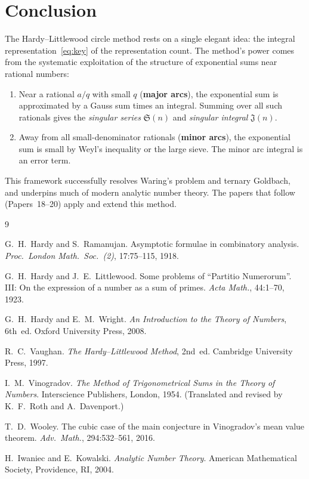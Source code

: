 \documentclass[12pt,a4paper]{amsart}
\theoremstyle{definition}
\begin{document}
\section{Conclusion}

The Hardy--Littlewood circle method rests on a single elegant idea: the
integral representation~\eqref{eq:key} of the representation count.
The method's power comes from the systematic exploitation of the
structure of exponential sums near rational numbers:
\begin{enumerate}
  \item Near a rational $a/q$ with small $q$ (\textbf{major arcs}),
    the exponential sum is approximated by a Gauss sum times an integral.
    Summing over all such rationals gives the \emph{singular series}
    $\mathfrak{S}(n)$ and \emph{singular integral} $\mathfrak{J}(n)$.
  \item Away from all small-denominator rationals (\textbf{minor arcs}),
    the exponential sum is small by Weyl's inequality or the large sieve.
    The minor arc integral is an error term.
\end{enumerate}

This framework successfully resolves Waring's problem and ternary Goldbach,
and underpins much of modern analytic number theory.  The papers that follow
(Papers~18--20) apply and extend this method.

\begin{thebibliography}{9}

G.~H.~Hardy and S.~Ramanujan.
\newblock Asymptotic formulae in combinatory analysis.
\newblock \emph{Proc.\ London Math.\ Soc.\ (2)}, 17:75--115, 1918.

G.~H.~Hardy and J.~E.~Littlewood.
\newblock Some problems of ``Partitio Numerorum''.  III: On the expression of
  a number as a sum of primes.
\newblock \emph{Acta Math.}, 44:1--70, 1923.

G.~H.~Hardy and E.~M.~Wright.
\newblock \emph{An Introduction to the Theory of Numbers}, 6th~ed.
\newblock Oxford University Press, 2008.

R.~C.~Vaughan.
\newblock \emph{The Hardy--Littlewood Method}, 2nd~ed.
\newblock Cambridge University Press, 1997.

I.~M.~Vinogradov.
\newblock \emph{The Method of Trigonometrical Sums in the Theory of Numbers}.
\newblock Interscience Publishers, London, 1954.
  (Translated and revised by K.~F.~Roth and A.~Davenport.)

T.~D.~Wooley.
\newblock The cubic case of the main conjecture in Vinogradov's mean value theorem.
\newblock \emph{Adv.\ Math.}, 294:532--561, 2016.

H.~Iwaniec and E.~Kowalski.
\newblock \emph{Analytic Number Theory}.
\newblock American Mathematical Society, Providence, RI, 2004.

\end{thebibliography}
\end{document}
